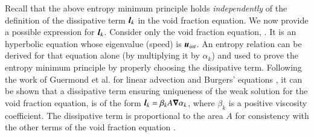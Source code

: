 \documentclass[preprint,10pt]{elsarticle}
\begin{document}
Recall that the above entropy minimum principle holds {\it independently} of the definition of the dissipative term $\boldsymbol l_k$
in the void fraction equation. We now provide a possible expression for $\boldsymbol l_k$.
%
Consider only the void fraction equation, . It is an hyperbolic equation
whose eigenvalue (speed) is $\boldsymbol u_{int}$. An entropy relation can be derived for that equation alone (by multiplying it by $\alpha_k$)
and used to prove the entropy minimum principle by properly choosing the dissipative term.
Following
the work of Guermond et al. for linear advection and Burgers' equations \cite{jlg1, jlg2}, it can be shown that a dissipative term ensuring 
uniqueness of the weak solution for the void fraction equation, is of the form $\boldsymbol l_k = \beta_k A \boldsymbol\nabla \alpha_k $, where $\beta_k$
is a positive viscosity coefficient. The dissipative term is proportional to the area $A$ for consistency with the other terms of the void fraction equation .
\end{document}
